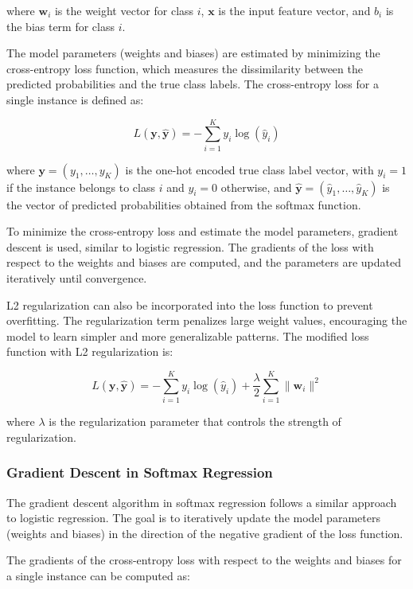 \documentclass[letterpaper,10pt]{article}
\begin{document}
where $\mathbf{w}_i$ is the weight vector for class $i$, $\mathbf{x}$ is the input feature vector, and $b_i$ is the bias term for class $i$. \par

The model parameters (weights and biases) are estimated by minimizing the cross-entropy loss function, which measures the dissimilarity between the predicted probabilities and the true class labels. The cross-entropy loss for a single instance is defined as:

\[ L(\mathbf{y}, \hat{\mathbf{y}}) = -\sum_{i=1}^{K} y_i \log(\hat{y}_i) \]

where $\mathbf{y} = (y_1, \dots, y_K)$ is the one-hot encoded true class label vector, with $y_i = 1$ if the instance belongs to class $i$ and $y_i = 0$ otherwise, and $\hat{\mathbf{y}} = (\hat{y}_1, \dots, \hat{y}_K)$ is the vector of predicted probabilities obtained from the softmax function. \par

To minimize the cross-entropy loss and estimate the model parameters, gradient descent is used, similar to logistic regression. The gradients of the loss with respect to the weights and biases are computed, and the parameters are updated iteratively until convergence. \par

L2 regularization can also be incorporated into the loss function to prevent overfitting. The regularization term penalizes large weight values, encouraging the model to learn simpler and more generalizable patterns. The modified loss function with L2 regularization is:

\[ L(\mathbf{y}, \hat{\mathbf{y}}) = -\sum_{i=1}^{K} y_i \log(\hat{y}_i) + \frac{\lambda}{2} \sum_{i=1}^{K} \|\mathbf{w}_i\|^2 \]

where $\lambda$ is the regularization parameter that controls the strength of regularization. \par

\subsubsection{Gradient Descent in Softmax Regression}
The gradient descent algorithm in softmax regression follows a similar approach to logistic regression. The goal is to iteratively update the model parameters (weights and biases) in the direction of the negative gradient of the loss function. \par

The gradients of the cross-entropy loss with respect to the weights and biases for a single instance can be computed as:
\end{document}
